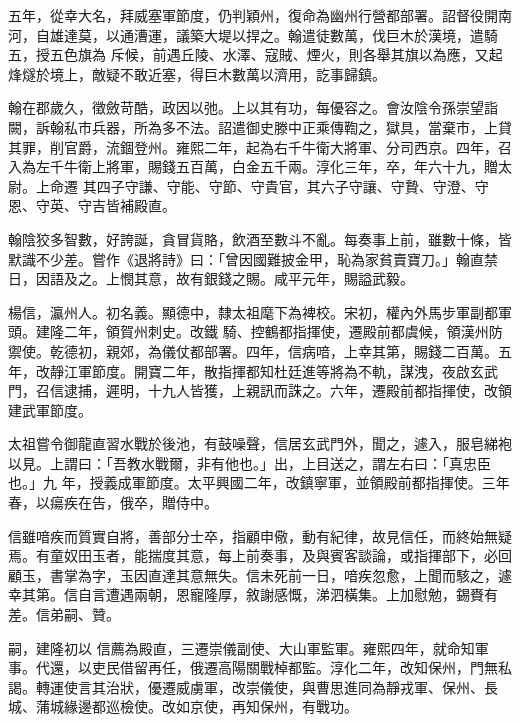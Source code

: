 \begin{pinyinscope}
 五年，從幸大名，拜威塞軍節度，仍判穎州，復命為幽州行營都部署。詔督役開南河，自雄達莫，以通漕運，議築大堤以捍之。翰遣徒數萬，伐巨木於漢境，遣騎五，授五色旗為
 斥候，前遇丘陵、水澤、寇賊、煙火，則各舉其旗以為應，又起烽燧於境上，敵疑不敢近塞，得巨木數萬以濟用，訖事歸鎮。



 翰在郡歲久，徵斂苛酷，政因以弛。上以其有功，每優容之。會汝陰令孫崇望詣闕，訴翰私市兵器，所為多不法。詔遣御史滕中正乘傳鞫之，獄具，當棄市，上貸其罪，削官爵，流錮登州。雍熙二年，起為右千牛衛大將軍、分司西京。四年，召入為左千牛衛上將軍，賜錢五百萬，白金五千兩。淳化三年，卒，年六十九，贈太尉。上命遷
 其四子守謙、守能、守節、守貴官，其六子守讓、守贄、守澄、守恩、守英、守吉皆補殿直。



 翰陰狡多智數，好誇誕，貪冒貨賂，飲酒至數斗不亂。每奏事上前，雖數十條，皆默識不少差。嘗作《退將詩》曰：「曾因國難披金甲，恥為家貧賣寶刀。」翰直禁日，因語及之。上憫其意，故有銀錢之賜。咸平元年，賜謚武毅。



 楊信，瀛州人。初名義。顯德中，隸太祖麾下為裨校。宋初，權內外馬步軍副都軍頭。建隆二年，領賀州刺史。改鐵
 騎、控鶴都指揮使，遷殿前都虞候，領漢州防禦使。乾德初，親郊，為儀仗都部署。四年，信病喑，上幸其第，賜錢二百萬。五年，改靜江軍節度。開寶二年，散指揮都知杜廷進等將為不軌，謀洩，夜啟玄武門，召信逮捕，遲明，十九人皆獲，上親訊而誅之。六年，遷殿前都指揮使，改領建武軍節度。



 太祖嘗令御龍直習水戰於後池，有鼓噪聲，信居玄武門外，聞之，遽入，服皂綈袍以見。上謂曰：「吾教水戰爾，非有他也。」出，上目送之，謂左右曰：「真忠臣也。」九
 年，授義成軍節度。太平興國二年，改鎮寧軍，並領殿前都指揮使。三年春，以瘍疾在告，俄卒，贈侍中。



 信雖喑疾而質實自將，善部分士卒，指顧申儆，動有紀律，故見信任，而終始無疑焉。有童奴田玉者，能揣度其意，每上前奏事，及與賓客談論，或指揮部下，必回顧玉，書掌為字，玉因直達其意無失。信未死前一日，喑疾忽愈，上聞而駭之，遽幸其第。信自言遭遇兩朝，恩寵隆厚，敘謝感慨，涕泗橫集。上加慰勉，錫賚有差。信弟嗣、贊。



 嗣，建隆初以
 信薦為殿直，三遷崇儀副使、大山軍監軍。雍熙四年，就命知軍事。代還，以吏民借留再任，俄遷高陽關戰棹都監。淳化二年，改知保州，門無私謁。轉運使言其治狀，優遷威虜軍，改崇儀使，與曹思進同為靜戎軍、保州、長城、蒲城緣邊都巡檢使。改如京使，再知保州，有戰功。




\end{pinyinscope}

